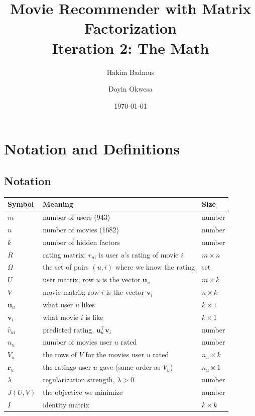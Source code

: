 \documentclass[11pt]{article}
\title{Movie Recommender with Matrix Factorization\\[2pt]\large Iteration 2: The Math}
\author{Hakim Badmus \and Doyin Okwesa}
\date{\today}
\theoremstyle{definition}
\begin{document}
\maketitle

\section{Notation and Definitions}

\subsection{Notation}
\begin{center}\small
\begin{tabular}{lll}
\toprule
Symbol & Meaning & Size\\
\midrule
$m$ & number of users (943) & number\\
$n$ & number of movies (1682) & number\\
$k$ & number of hidden factors & number\\
$R$ & rating matrix; $r_{ui}$ is user $u$'s rating of movie $i$ & $m\times n$\\
$\Omega$ & the set of pairs $(u,i)$ where we know the rating & set\\
$U$ & user matrix; row $u$ is the vector $\mathbf u_u$ & $m\times k$\\
$V$ & movie matrix; row $i$ is the vector $\mathbf v_i$ & $n\times k$\\
$\mathbf u_u$ & what user $u$ likes & $k\times1$\\
$\mathbf v_i$ & what movie $i$ is like & $k\times1$\\
$\hat r_{ui}$ & predicted rating, $\mathbf u_u^\top\mathbf v_i$ & number\\
$n_u$ & number of movies user $u$ rated & number\\
$V_u$ & the rows of $V$ for the movies user $u$ rated & $n_u\times k$\\
$\mathbf r_u$ & the ratings user $u$ gave (same order as $V_u$) & $n_u\times1$\\
$\lambda$ & regularization strength, $\lambda>0$ & number\\
$J(U,V)$ & the objective we minimize & number\\
$I$ & identity matrix & $k\times k$\\
\bottomrule
\end{tabular}
\end{center}
\end{document}
